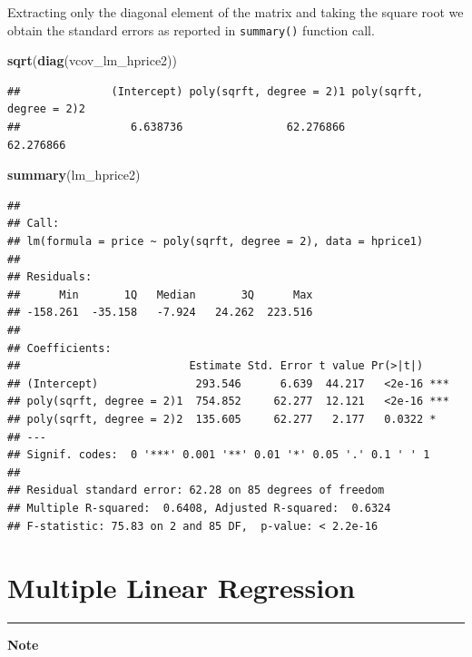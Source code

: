 \documentclass[]{book}
\newenvironment{Shaded}{\begin{snugshade}}{\end{snugshade}}
\newcommand{\KeywordTok}[1]{\textcolor[rgb]{0.13,0.29,0.53}{\textbf{#1}}}
\newcommand{\NormalTok}[1]{#1}
\begin{document}
Extracting only the diagonal element of the matrix and taking the square
root we obtain the standard errors as reported in \texttt{summary()}
function call.

\begin{Shaded}
\begin{Highlighting}[]
\KeywordTok{sqrt}\NormalTok{(}\KeywordTok{diag}\NormalTok{(vcov_lm_hprice2))}
\end{Highlighting}
\end{Shaded}

\begin{verbatim}
##              (Intercept) poly(sqrft, degree = 2)1 poly(sqrft, degree = 2)2 
##                 6.638736                62.276866                62.276866
\end{verbatim}

\begin{Shaded}
\begin{Highlighting}[]
\KeywordTok{summary}\NormalTok{(lm_hprice2)}
\end{Highlighting}
\end{Shaded}

\begin{verbatim}
## 
## Call:
## lm(formula = price ~ poly(sqrft, degree = 2), data = hprice1)
## 
## Residuals:
##      Min       1Q   Median       3Q      Max 
## -158.261  -35.158   -7.924   24.262  223.516 
## 
## Coefficients:
##                          Estimate Std. Error t value Pr(>|t|)    
## (Intercept)               293.546      6.639  44.217   <2e-16 ***
## poly(sqrft, degree = 2)1  754.852     62.277  12.121   <2e-16 ***
## poly(sqrft, degree = 2)2  135.605     62.277   2.177   0.0322 *  
## ---
## Signif. codes:  0 '***' 0.001 '**' 0.01 '*' 0.05 '.' 0.1 ' ' 1
## 
## Residual standard error: 62.28 on 85 degrees of freedom
## Multiple R-squared:  0.6408, Adjusted R-squared:  0.6324 
## F-statistic: 75.83 on 2 and 85 DF,  p-value: < 2.2e-16
\end{verbatim}

\hypertarget{multiple-linear-regression}{%
\section{Multiple Linear Regression}\label{multiple-linear-regression}}

\begin{center}\rule{0.5\linewidth}{\linethickness}\end{center}

\textbf{Note}
\end{document}
